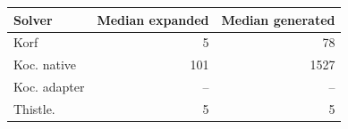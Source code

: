 \begin{tabular}{p{}rr}
\hline
Solver & Median expanded & Median generated \\
\hline
Korf & 5 & 78 \\
Koc. native & 101 & 1527 \\
Koc. adapter & -- & -- \\
Thistle. & 5 & 5 \\
\hline
\end{tabular}
